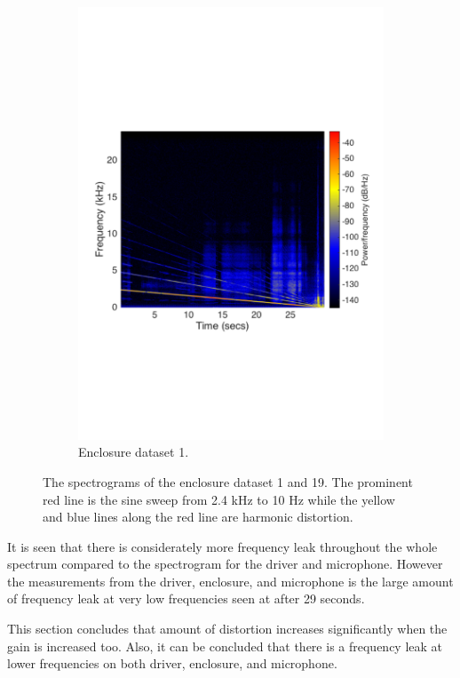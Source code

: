 \begin{figure}[H]
\begin{subfigure}[t]{0.47\textwidth}
	\includegraphics[width=1\textwidth]{figures/spectrogram_enclosure19.pdf}
	\caption{Enclosure dataset 1.}
	\label{fig:spectrogram_enclosure19}
\end{subfigure}
\caption{The spectrograms of the enclosure dataset 1 and 19. The prominent red line is the sine sweep from 2.4 kHz to 10 Hz while the yellow and blue lines along the red line are harmonic distortion.}
\label{fig:spec_enclosure}
\end{figure} 

It is seen that there is considerately more frequency leak throughout the whole spectrum compared to the spectrogram for the driver and microphone. However the measurements from the driver, enclosure, and microphone is the large amount of frequency leak at very low frequencies seen at after 29 seconds.

This section concludes that amount of distortion increases significantly when the gain is increased too. Also, it can be concluded that there is a frequency leak at lower frequencies on both driver, enclosure, and microphone. 



